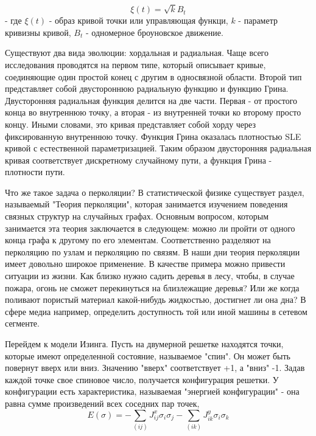 \documentclass[12pt,a4paper]{article}
\begin{document}
	\begin{equation}\label{invar}
		\xi(t) = \sqrt{k}B_{t}
	\end{equation}
	 - где $\xi(t)$ - образ кривой точки или управляющая функци, $k$ - параметр кривизны кривой, $B_{t}$ - одномерное броуновское движение.
	\par Существуют два вида эволюции: хордальная и радиальная. Чаще всего исследования проводятся на первом типе, который описывает кривые, соединяющие один простой конец с другим в односвязной области. Второй тип представляет собой двустороннюю радиальную функцию и функцию Грина. Двусторонняя радиальная функция делится на две части. Первая - от простого конца во внутреннюю точку, а вторая - из внутренней точки ко второму просто концу. Иными словами, это кривая представляет собой хорду через фиксированную внутреннюю точку. Функция Грина оказалась плотностью SLE кривой с естественной параметризацией. Таким образом двусторонняя радиальная кривая соответствует дискретному случайному пути, а функция Грина - плотности пути. 
	
	
	\par Что же такое задача о перколяции? В статистической физике существует раздел, называемый "Теория перколяции", которая занимается изучением поведения связных структур на случайных графах. Основным вопросом, которым занимается эта теория заключается в следующем: можно ли пройти от одного конца графа к другому по его элементам. Соответственно разделяют на перколяцию по узлам и перколяцию по связям. В наши дни теория перколяции имеет довольно широкое применение. В качестве примера можно привести ситуации из жизни. Как близко нужно садить деревья в лесу, чтобы, в случае пожара, огонь не сможет перекинуться на близлежащие деревья? Или же когда поливают пористый материал какой-нибудь жидкостью, достигнет ли она дна? В сфере медиа например, определить доступность той или иной машины в сетевом сегменте.
	
	\par Перейдем к модели Изинга. Пусть на двумерной решетке находятся точки, которые имеют определенной состояние, называемое "спин". Он может быть повернут вверх или вниз. Значению "вверх" соответствует +1, а "вниз" -1. Задав каждой точке свое спиновое число, получается конфигурация решетки. У конфигурации есть характеристика, называемая "энергией конфигурации" - она равна сумме произведений всех соседних пар точек,
	\begin{equation}\label{conf_energy}
		E({\sigma}) = - \sum_{(ij)}J_{ij}^{x}\sigma_{i}\sigma_{j} -\sum_{(ik)}J_{ik}^{y}\sigma_{i}\sigma_{k}
	\end{equation}
	
\end{document}
